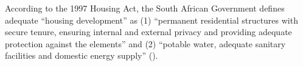 \documentclass[12pt]{article}
\begin{document}



According to the 1997 Housing Act, the South African Government defines adequate ``housing development'' as (1) ``permanent residential structures with secure tenure, ensuring internal and external privacy and providing adequate protection against the elements'' and (2) ``potable water, adequate sanitary facilities and domestic energy supply'' (\cite{housingact}).  
\end{document}
